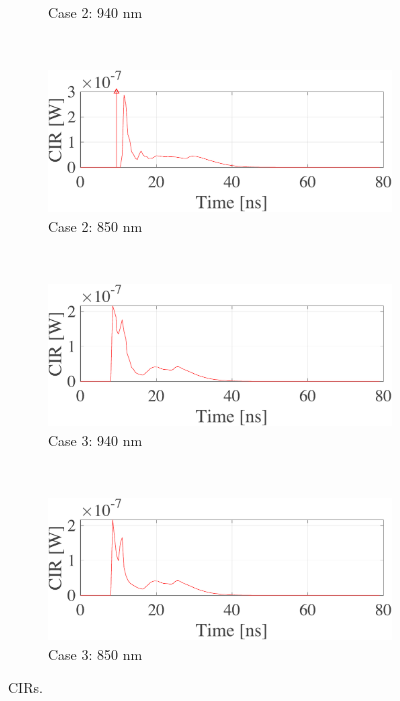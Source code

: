 \begin{figure}[h]
\begin{subfigure}[b]{0.49\columnwidth}
                \caption{Case 2: 940 nm}
            \end{subfigure}~
            \begin{subfigure}[b]{0.49\columnwidth}
                \centering
                \includegraphics[width=1\columnwidth,draft=false]{./ch_background/figs/case2_ul.pdf}
                \caption{Case 2: 850 nm}
            \end{subfigure}\\
            \begin{subfigure}[b]{0.49\columnwidth}
                \centering
                \includegraphics[width=1\columnwidth,draft=false]{./ch_background/figs/case3_ul_n.pdf}
                \caption{Case 3: 940 nm}
            \end{subfigure}~
            \begin{subfigure}[b]{0.49\columnwidth}
                \centering
                \includegraphics[width=1\columnwidth,draft=false]{./ch_background/figs/case3_ul.pdf}
                \caption{Case 3: 850 nm}
            \end{subfigure}
            \caption{CIRs.}
            \label{fig:ch_background:casesres}
        \end{figure} 

